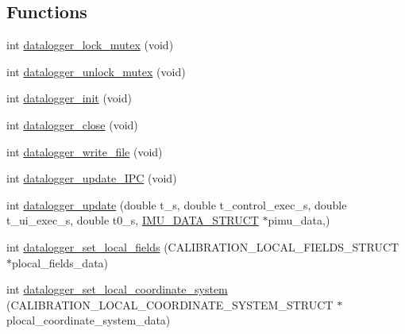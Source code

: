 \subsection*{Functions}
\begin{DoxyCompactItemize}
\item 
int \hyperlink{datalogger_01_07Caio-PC's_01conflicted_01copy_012012-11-23_08_8c_a54b06d9395b2e370a5a72beb7f9524b2}{datalogger\-\_\-lock\-\_\-mutex} (void)
\item 
int \hyperlink{datalogger_01_07Caio-PC's_01conflicted_01copy_012012-11-23_08_8c_a85453211c0c809083c36cc56b275aeeb}{datalogger\-\_\-unlock\-\_\-mutex} (void)
\item 
int \hyperlink{datalogger_01_07Caio-PC's_01conflicted_01copy_012012-11-23_08_8c_a1977ef253746fd8c008a3641d9822551}{datalogger\-\_\-init} (void)
\item 
int \hyperlink{datalogger_01_07Caio-PC's_01conflicted_01copy_012012-11-23_08_8c_ad22dbe9e235e7ae5737a23796d13ffbd}{datalogger\-\_\-close} (void)
\item 
int \hyperlink{datalogger_01_07Caio-PC's_01conflicted_01copy_012012-11-23_08_8c_a2aedecfce53e1935a41615ceaf378013}{datalogger\-\_\-write\-\_\-file} (void)
\item 
int \hyperlink{datalogger_01_07Caio-PC's_01conflicted_01copy_012012-11-23_08_8c_a25bb814a0877f419ae09b08cd7e91ee9}{datalogger\-\_\-update\-\_\-\-I\-P\-C} (void)
\item 
int \hyperlink{datalogger_01_07Caio-PC's_01conflicted_01copy_012012-11-23_08_8c_a360547e43bc240bf2ad44656dc70a590}{datalogger\-\_\-update} (double t\-\_\-s, double t\-\_\-control\-\_\-exec\-\_\-s, double t\-\_\-ui\-\_\-exec\-\_\-s, double t0\-\_\-s, \hyperlink{structIMU__DATA__STRUCT}{I\-M\-U\-\_\-\-D\-A\-T\-A\-\_\-\-S\-T\-R\-U\-C\-T} $\ast$pimu\-\_\-data,)
\item 
int \hyperlink{datalogger_01_07Caio-PC's_01conflicted_01copy_012012-11-23_08_8c_aedb2e01731eb308da0f3a664b29ff18d}{datalogger\-\_\-set\-\_\-local\-\_\-fields} (C\-A\-L\-I\-B\-R\-A\-T\-I\-O\-N\-\_\-\-L\-O\-C\-A\-L\-\_\-\-F\-I\-E\-L\-D\-S\-\_\-\-S\-T\-R\-U\-C\-T $\ast$plocal\-\_\-fields\-\_\-data)
\item 
int \hyperlink{datalogger_01_07Caio-PC's_01conflicted_01copy_012012-11-23_08_8c_ada9c5776313f813d446d1014822912ad}{datalogger\-\_\-set\-\_\-local\-\_\-coordinate\-\_\-system} (C\-A\-L\-I\-B\-R\-A\-T\-I\-O\-N\-\_\-\-L\-O\-C\-A\-L\-\_\-\-C\-O\-O\-R\-D\-I\-N\-A\-T\-E\-\_\-\-S\-Y\-S\-T\-E\-M\-\_\-\-S\-T\-R\-U\-C\-T $\ast$plocal\-\_\-coordinate\-\_\-system\-\_\-data)

\end{DoxyCompactItemize}
